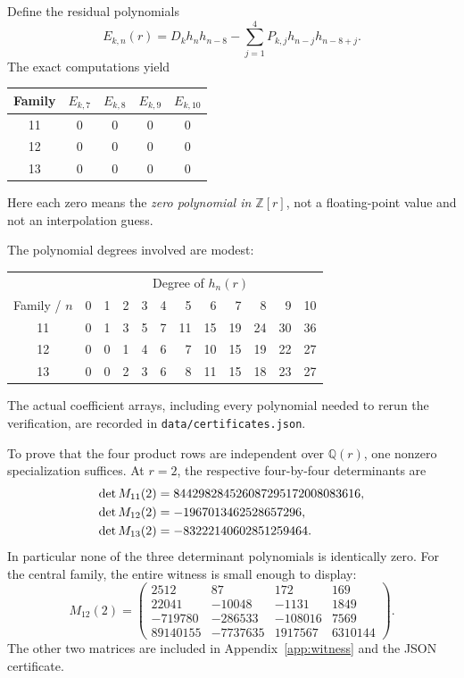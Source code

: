 \documentclass[11pt,letterpaper]{article}
\numberwithin{equation}{section}
\theoremstyle{definition}
\newcommand{\Z}{\mathbb Z}
\newcommand{\Q}{\mathbb Q}
\begin{document}
Define the residual polynomials
\begin{equation}
 E_{k,n}(r)=D_kh_nh_{n-8}
 -\sum_{j=1}^4P_{k,j}h_{n-j}h_{n-8+j}.
 \label{eq:residual}
\end{equation}
The exact computations yield
\begin{center}
\begin{tabular}{c c c c c}
\toprule
Family & \(E_{k,7}\) & \(E_{k,8}\) & \(E_{k,9}\) & \(E_{k,10}\)\\
\midrule
11 & \(0\) & \(0\) & \(0\) & \(0\)\\
12 & \(0\) & \(0\) & \(0\) & \(0\)\\
13 & \(0\) & \(0\) & \(0\) & \(0\)\\
\bottomrule
\end{tabular}
\end{center}
Here each zero means the \emph{zero polynomial in \(\Z[r]\)}, not a
floating-point value and not an interpolation guess.

The polynomial degrees involved are modest:
\begin{center}
\small
\begin{tabular}{c rrrrrrrrrrr}
\toprule
 & \multicolumn{11}{c}{Degree of \(h_n(r)\)}\\
Family / \(n\) &0&1&2&3&4&5&6&7&8&9&10\\
\midrule
11&0&1&3&5&7&11&15&19&24&30&36\\
12&0&0&1&4&6&7&10&15&19&22&27\\
13&0&0&2&3&6&8&11&15&18&23&27\\
\bottomrule
\end{tabular}
\end{center}
The actual coefficient arrays, including every polynomial needed to rerun
the verification, are recorded in \texttt{data/certificates.json}.

To prove that the four product rows are independent over \(\Q(r)\), one
nonzero specialization suffices. At \(r=2\), the respective four-by-four
determinants are
\begin{align}
 \det M_{11}(2)&=844298284526087295172008083616,\notag\\
 \det M_{12}(2)&=-1967013462528657296,\notag\\
 \det M_{13}(2)&=-83222140602851259464.
 \label{eq:witnesses}
\end{align}
In particular none of the three determinant polynomials is identically zero.
For the central family, the entire witness is small enough to display:
\begin{equation}
 M_{12}(2)=
 \begin{pmatrix}
 2512&87&172&169\\
 22041&-10048&-1131&1849\\
 -719780&-286533&-108016&7569\\
 89140155&-7737635&1917567&6310144
 \end{pmatrix}.
 \label{eq:M12}
\end{equation}
The other two matrices are included in Appendix~\ref{app:witness} and the
JSON certificate.
\end{document}
